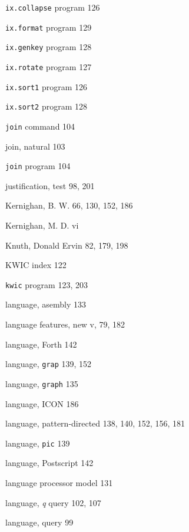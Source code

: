 \begin{multicols}{3}
\hangindent=3pc  \verb'ix.collapse' program 126

\hangindent=3pc  \verb'ix.format' program 129 

\hangindent=3pc  \verb'ix.genkey' program 128 

\hangindent=3pc  \verb'ix.rotate' program 127 

\hangindent=3pc  \verb'ix.sort1' program 126

\hangindent=3pc  \verb'ix.sort2' program 128 

\hangindent=3pc  \verb'join' command 104

\hangindent=3pc  join, natural 103

\hangindent=3pc  \verb'join' program 104

\hangindent=3pc  justification, test 98, 201

\hangindent=3pc  Kernighan, B. W. 66, 130, 152, 186

\hangindent=3pc  Kernighan, M. D. vi 

\hangindent=3pc  Knuth, Donald Ervin 82, 179, 198

\hangindent=3pc  KWIC index 122

\hangindent=3pc  \verb'kwic' program 123, 203

\hangindent=3pc  language, asembly 133

\hangindent=3pc  language features, new v, 79, 182

\hangindent=3pc  language, Forth 142

\hangindent=3pc  language, \verb'grap' 139, 152

\hangindent=3pc  language, \verb'graph' 135

\hangindent=3pc  language, ICON 186

\hangindent=3pc  language, pattern-directed 138, 140, 152, 156, 181

\hangindent=3pc  language, \verb'pic' 139

\hangindent=3pc  language, Postscript 142

\hangindent=3pc  language processor model 131

\hangindent=3pc  language, \textit{q} query 102, 107

\hangindent=3pc  language, query 99


\end{multicols}
